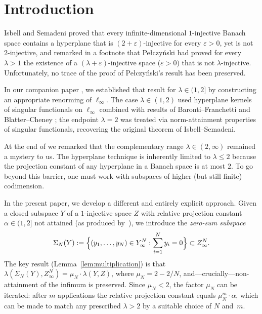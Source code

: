\documentclass[11pt]{amsart}
\renewcommand{\le}{\leqslant}
\theoremstyle{definition}
\theoremstyle{remark}
\theoremstyle{plain}
\numberwithin{equation}{section}
\begin{document}
\maketitle

\section{Introduction}

Isbell and Semadeni \cite{IsbellSemadeni} proved that every
infinite-dimensional $1$-injective Banach space contains a hyperplane
that is $(2+\varepsilon)$-injective for every $\varepsilon > 0$, yet is
not $2$-injective, and remarked in a footnote that Pe{\l}czy\'nski had
proved for every $\lambda > 1$ the existence of a
$(\lambda + \varepsilon)$-injective space ($\varepsilon > 0$) that is
not $\lambda$-injective.  Unfortunately, no trace of the proof of
Pe{\l}czy\'nski's result has been preserved.

In our companion paper \cite{KaniaLewicki}, we established that result
for $\lambda\in(1,2]$ by constructing an appropriate renorming of
$\ell_\infty$.  The case $\lambda\in(1,2)$ used hyperplane kernels of
singular functionals on $\ell_\infty$ combined with results of
Baronti--Franchetti \cite{BarontiF} and Blatter--Cheney
\cite{BlatterCheney}; the endpoint $\lambda=2$ was treated via
norm-attainment properties of singular functionals, recovering the
original theorem of Isbell--Semadeni.

At the end of \cite{KaniaLewicki} we remarked that the complementary
range $\lambda\in(2,\infty)$ remained a mystery to us.  The hyperplane
technique is inherently limited to $\lambda\le 2$ because the projection
constant of any hyperplane in a Banach space is at most $2$.  To go
beyond this barrier, one must work with subspaces of higher (but still
finite) codimension.

In the present paper, we develop a different and entirely explicit
approach.  Given a closed subspace $Y$ of a $1$-injective space $Z$
with relative projection constant $\alpha\in(1,2]$ not attained (as
produced by~\cite{KaniaLewicki}), we introduce the
\emph{zero-sum subspace}
\[
\Sigma_N(Y):=\Bigl\{(y_1,\dots,y_N)\in Y_\infty^N:
\sum_{i=1}^N y_i=0\Bigr\}
\subset Z_\infty^N.
\]
The key result (Lemma~\ref{lem:multiplication}) is that
$\lambda(\Sigma_N(Y),Z_\infty^N)=\mu_N\cdot\lambda(Y,Z)$, where
$\mu_N=2-2/N$, and---crucially---non-attainment of the infimum is
preserved.  Since $\mu_N<2$, the factor $\mu_N$ can be iterated: after
$m$ applications the relative projection constant equals
$\mu_N^m\cdot\alpha$, which can be made to match any prescribed
$\lambda>2$ by a suitable choice of $N$ and~$m$.
\end{document}
